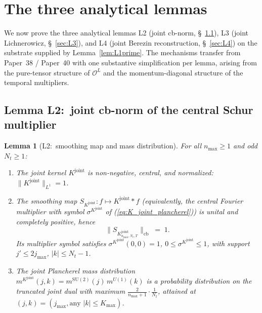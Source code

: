 \documentclass[11pt,a4paper]{article}
\theoremstyle{plain}
\newtheorem{lemma}[theorem]{Lemma}
\theoremstyle{definition}
\newcommand{\nmax}{n_{\max}}
\newcommand{\Nt}{N_{t}}
\newcommand{\Kmax}{K_{\max}}
\newcommand{\Op}{\mathcal{O}}
\newcommand{\cbnorm}[1]{\lVert #1 \rVert_{\mathrm{cb}}}
\newcommand{\norm}[1]{\lVert #1 \rVert}
\newcommand{\SU}{\mathrm{SU}}
\newcommand{\Uone}{U(1)}
\newcommand{\Kjoint}{K^{\mathrm{joint}}}
\begin{document}
\section{The three analytical lemmas}\label{sec:lemmas}

We now prove the three analytical lemmas L2 (joint cb-norm,
\S~\ref{sec:L2}), L3 (joint Lichnerowicz, \S~\ref{sec:L3}), and L4
(joint Berezin reconstruction, \S~\ref{sec:L4}) on the substrate
supplied by Lemma~\ref{lem:L1prime}. The mechanisms transfer from
Paper~38 / Paper~40 with one substantive simplification per lemma,
arising from the pure-tensor structure of $\Op^{L}$ and the
momentum-diagonal structure of the temporal multipliers.

\subsection{Lemma L2:\ joint cb-norm of the central Schur multiplier}
\label{sec:L2}

\begin{lemma}[L2:\ smoothing map and mass distribution]
\label{lem:L2}
For all $\nmax \ge 1$ and odd $\Nt \ge 1$:
\begin{enumerate}
\item[(a)] The joint kernel $\Kjoint$ is non-negative, central, and
normalized:\ $\norm{\Kjoint}_{L^{1}} = 1$.
\item[(b)] The smoothing map
$S_{\Kjoint} : f \mapsto \Kjoint \ast f$ (equivalently, the central
Fourier multiplier with symbol $\sigma^{\Kjoint}$ of
(\ref{eq:K_joint_plancherel})) is unital and completely positive,
hence
\begin{equation}\label{eq:L2_main}
   \cbnorm{S_{\Kjoint_{\nmax,\Nt,T}}} \;=\; 1.
\end{equation}
Its multiplier symbol satisfies $\sigma^{\Kjoint}(0, 0) = 1$,
$0 \le \sigma^{\Kjoint} \le 1$, with support
$j' \le 2j_{\max}$, $|k| \le \Nt - 1$.
\item[(c)] The joint Plancherel mass distribution
$m^{\Kjoint}(j, k) = m^{\SU(2)}(j)\,m^{\Uone}(k)$ is a probability
distribution on the truncated joint dual with maximum
$\tfrac{2}{\nmax+1} \cdot \tfrac{1}{\Nt}$, attained at
$(j, k) = (j_{\max}, \text{any } |k| \le \Kmax)$.
\end{enumerate}
\end{lemma}
\end{document}
